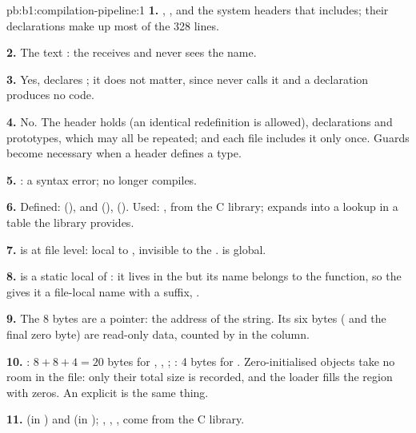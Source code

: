 \begin{solution}{pb:b1:compilation-pipeline:1}
\textbf{1.} , ,  and the system headers that  includes;
their declarations make up most of the 328 lines.

\textbf{2.} The text : the  receives  and never sees the name.

\textbf{3.} Yes,  declares ; it does not matter, since  never calls it and
a declaration produces no code.

\textbf{4.} No. The header holds  (an identical redefinition is allowed),  declarations and
prototypes, which may all be repeated; and each file includes it only once. Guards become necessary when a header
defines a type.

\textbf{5.} : a syntax error;  no longer compiles.

\textbf{6.} Defined:  (),  and  (),  ().
Used: , from the C library;  expands into a lookup in a table the library
provides.

\textbf{7.}  is  at file level: local to , invisible to the .
 is global.

\textbf{8.}  is a static local of : it lives in the  but its name belongs
to the function, so the  gives it a file-local name with a suffix, .

\textbf{9.} The 8 bytes are a pointer: the address of the string. Its six bytes ( and the final
zero byte) are read-only data, counted by  in the  column.

\textbf{10.} : $8 + 8 + 4 = 20$ bytes for , , ;
: 4 bytes for . Zero-initialised objects take no room in the file: only their total
size is recorded, and the loader fills the region with zeros. An explicit  is the same thing.

\textbf{11.}  (in ) and  (in ); , ,
,  come from the C library.


\end{solution}

